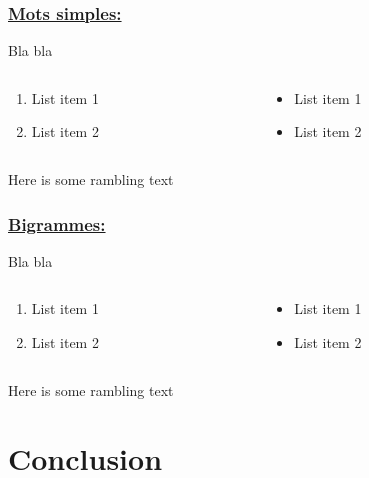 \documentclass[xcolor=dvipsnames]{beamer}
\begin{document}
	\begin{frame}
		\frametitle{\underline{Mots simples:}}
		Bla bla 
		\begin{columns}
			\begin{column}{0.5\textwidth} %
				\begin{enumerate}
					\item List item 1
					\item List item 2
				\end{enumerate}
			\end{column}
			\begin{column}{0.5\textwidth}
				\begin{itemize}
					\item List item 1
					\item List item 2
				\end{itemize}
			\end{column}
		\end{columns}
		\vspace{\baselineskip}
		Here is some rambling text
	\end{frame}

	\begin{frame}
		\frametitle{\underline{Bigrammes:}}
		Bla bla 
		\begin{columns}
			\begin{column}{0.5\textwidth} %
				\begin{enumerate}
					\item List item 1
					\item List item 2
				\end{enumerate}
			\end{column}
			\begin{column}{0.5\textwidth}
				\begin{itemize}
					\item List item 1
					\item List item 2
				\end{itemize}
			\end{column}
		\end{columns}
		\vspace{\baselineskip}
		Here is some rambling text
	\end{frame}

	\section*{Conclusion}
\end{document}
